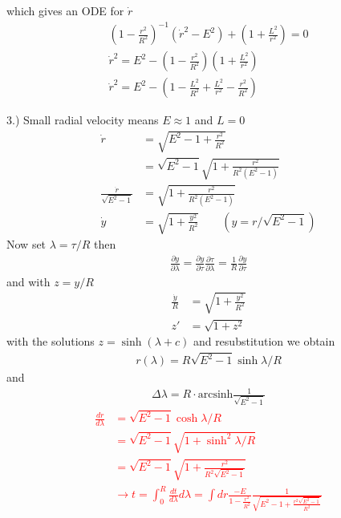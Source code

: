 \documentclass[10pt,a4paper]{book}
\theoremstyle{definition}
\begin{document}
which gives an ODE for $\dot{r}$
\begin{align}
\left(1-\frac{r^2}{R^2}\right)^{-1}(\dot{r}^2-E^2)+\left(1+\frac{L^2}{r^2}\right)=0\\
\dot{r}^2=E^2-\left(1-\frac{r^2}{R^2}\right)\left(1+\frac{L^2}{r^2}\right)\\
\dot{r}^2=E^2-\left(1-\frac{L^2}{R^2}+\frac{L^2}{r^2}-\frac{r^2}{R^2}\right)
\end{align}
\begin{center}
\end{center}
3.) Small radial velocity means $E\approx1$ and $L=0$
\begin{align}
\dot{r}&=\sqrt{E^2-1+\frac{r^2}{R^2}}\\
&=\sqrt{E^2-1}\sqrt{1+\frac{r^2}{R^2(E^2-1)}}\\
\frac{\dot{r}}{\sqrt{E^2-1}}&=\sqrt{1+\frac{r^2}{R^2(E^2-1)}}\\
\dot{y}&=\sqrt{1+\frac{y^2}{R^2}}\qquad(y=r/\sqrt{E^2-1})
\end{align}
Now set $\lambda=\tau/R$ then
\begin{align}
\frac{\partial y}{\partial \lambda}=\frac{\partial y}{\partial \tau}\frac{\partial \tau}{\partial \lambda}=\frac{1}{R}\frac{\partial y}{\partial \tau}
\end{align}
and with $z=y/R$
\begin{align}
\frac{\dot{y}}{R}&=\sqrt{1+\frac{y^2}{R^2}}\\
z'&=\sqrt{1+z^2}
\end{align}
with the solutions $z=\sinh(\lambda+c)$ and resubstitution we obtain
\begin{align}
r(\lambda)=R\sqrt{E^2-1}\sinh\lambda/R
\end{align}
and
\begin{align}
\Delta\lambda=R\cdot\text{arcsinh}\frac{1}{\sqrt{E^2-1}}
\end{align}
\textcolor{red}{
\begin{align}
\frac{dr}{d\lambda}&=\sqrt{E^2-1}\cosh\lambda/R\\
&=\sqrt{E^2-1}\sqrt{1+\sinh^2\lambda/R}\\
&=\sqrt{E^2-1}\sqrt{1+\frac{r^2}{R^2\sqrt{E^2-1}}}\\
&\rightarrow t=\int_0^R\frac{dt}{d\lambda} d\lambda=\int dr\frac{-E}{1-\frac{r^2}{R^2}}\frac{1}{\sqrt{E^2-1+\frac{r^2\sqrt{E^2-1}}{R^2}}}
\end{align}
}
\end{document}
